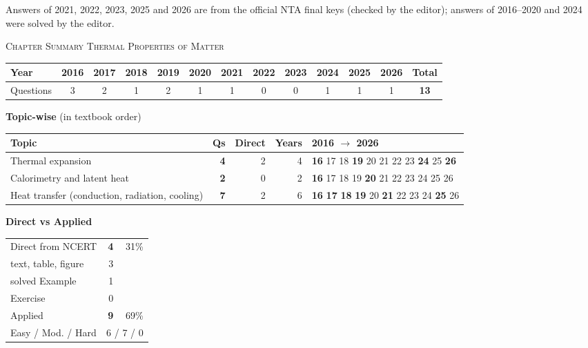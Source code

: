 {\footnotesize Answers of 2021, 2022, 2023, 2025 and 2026 are from the official NTA final keys (checked by the editor); answers of 2016--2020 and 2024 were solved by the editor.
}\par
\par{}\vspace{14pt}
\begin{center}{}\par
{\large\color{navy}\scshape Chapter Summary \textperiodcentered{} Thermal Properties of Matter}\end{center}
{\small\setlength{\tabcolsep}{3.5pt}
\begin{tabular*}{\linewidth}{@{\extracolsep{\fill}}l*{11}{c}c@{}}\toprule
Year & 2016 & 2017 & 2018 & 2019 & 2020 & 2021 & 2022 & 2023 & 2024 & 2025 & 2026 & Total\\\midrule
Questions & 3 & 2 & 1 & 2 & 1 & 1 & 0 & 0 & 1 & 1 & 1 & \textbf{13}\\\bottomrule\end{tabular*}}\par\medskip
{\small\textbf{\color{crimson}Topic-wise} (in textbook order)\par\smallskip
\begin{tabularx}{\linewidth}{@{}>{\raggedright\arraybackslash}Xrrrl@{}}\toprule
Topic & Qs & Direct & Years & 2016 $\rightarrow$ 2026\\\midrule
Thermal expansion & \textbf{4} & 2 & 4 & {\scriptsize \textbf{16} {\color{gray!45}17} {\color{gray!45}18} \textbf{19} {\color{gray!45}20} {\color{gray!45}21} {\color{gray!45}22} {\color{gray!45}23} \textbf{24} {\color{gray!45}25} \textbf{26}}\\
Calorimetry and latent heat & \textbf{2} & 0 & 2 & {\scriptsize \textbf{16} {\color{gray!45}17} {\color{gray!45}18} {\color{gray!45}19} \textbf{20} {\color{gray!45}21} {\color{gray!45}22} {\color{gray!45}23} {\color{gray!45}24} {\color{gray!45}25} {\color{gray!45}26}}\\
Heat transfer (conduction, radiation, cooling) & \textbf{7} & 2 & 6 & {\scriptsize \textbf{16} \textbf{17} \textbf{18} \textbf{19} {\color{gray!45}20} \textbf{21} {\color{gray!45}22} {\color{gray!45}23} {\color{gray!45}24} \textbf{25} {\color{gray!45}26}}\\
\bottomrule\end{tabularx}}\par\medskip
\begin{minipage}[t]{0.34\linewidth}{\small\textbf{\color{crimson}Direct vs Applied}\par\smallskip
\begin{tabular}{@{}lrr@{}}\toprule
Direct from NCERT & \textbf{4} & 31\%\\
\quad text, table, figure & 3 &\\
\quad solved Example & 1 &\\
\quad Exercise & 0 &\\
Applied & \textbf{9} & 69\%\\\midrule
Easy / Mod. / Hard & \multicolumn{2}{r}{6 / 7 / 0}\\\bottomrule
\end{tabular}}\end{minipage}\hfill
